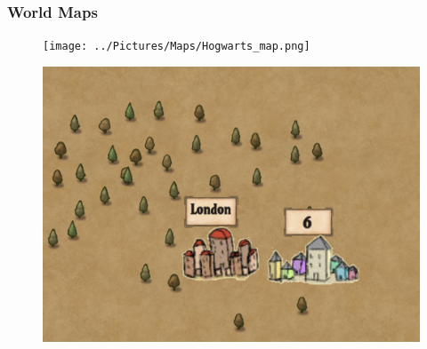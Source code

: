\subsubsection*{World Maps}
\begin{figure}[H]
\texttt{[image: ../Pictures/Maps/Hogwarts\_map.png]}
\end{figure}
\begin{figure}[H]
\includegraphics[max width=\textwidth]{../Pictures/Maps/Diagon_Alley_map.png}
\end{figure}
